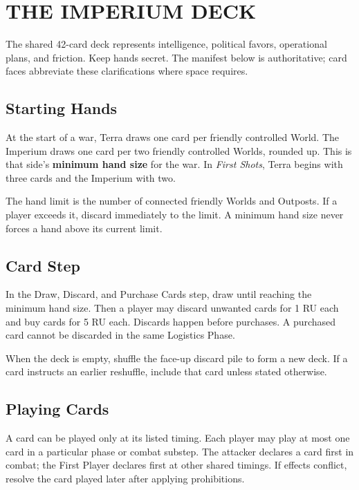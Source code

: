 \section{THE IMPERIUM DECK}

The shared 42-card deck represents intelligence, political favors, operational
plans, and friction. Keep hands secret. The manifest below is authoritative;
card faces abbreviate these clarifications where space requires.

\subsection{Starting Hands}

At the start of a war, Terra draws one card per friendly controlled World. The
Imperium draws one card per two friendly controlled Worlds, rounded up. This is
that side's \textbf{minimum hand size} for the war. In \textit{First Shots},
Terra begins with three cards and the Imperium with two.

The hand limit is the number of connected friendly Worlds and Outposts. If a
player exceeds it, discard immediately to the limit. A minimum hand size never
forces a hand above its current limit.

\subsection{Card Step}

In the Draw, Discard, and Purchase Cards step, draw until reaching the minimum
hand size. Then a player may discard unwanted cards for 1 RU each and buy cards
for 5 RU each. Discards happen before purchases. A purchased card cannot be
discarded in the same Logistics Phase.

When the deck is empty, shuffle the face-up discard pile to form a new deck.
If a card instructs an earlier reshuffle, include that card unless stated
otherwise.

\subsection{Playing Cards}

A card can be played only at its listed timing. Each player may play at most
one card in a particular phase or combat substep. The attacker declares a card
first in combat; the First Player declares first at other shared timings. If
effects conflict, resolve the card played later after applying prohibitions.


